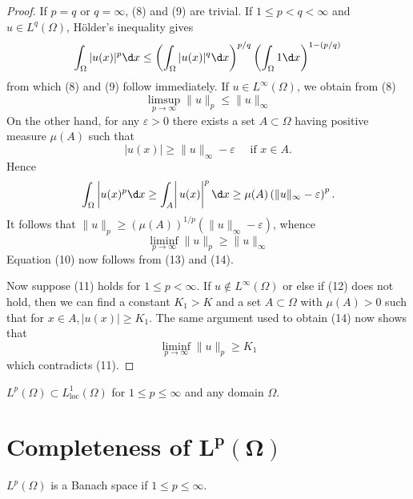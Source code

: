 \begin{proof}
  If $p=q$ or $q=\infty$, (8) and (9) are trivial. If $1 \leq p<q<\infty$ and $u \in L^q(\Omega)$, Hölder's inequality gives
  \[
  \int_{\Omega}|u(x)|^p \d x \leq\left(\int_{\Omega}|u(x)|^q \d x\right)^{p / q}\left(\int_{\Omega} 1 \d x\right)^{1-(p / q)}
  \]
  from which (8) and (9) follow immediately. If $u \in L^{\infty}(\Omega)$, we obtain from (8)
  \begin{equation}\label{eq:2.13}
    \limsup_{p\rightarrow \infty}\|u\|_p \leq\|u\|_{\infty}
  \end{equation}
  On the other hand, for any $\varepsilon>0$ there exists a set $A \subset \Omega$ having positive measure $\mu(A)$ such that
  \[
  |u(x)| \geq\|u\|_{\infty}-\varepsilon \quad \text { if } x \in A .
  \]
  Hence
  \[
  \left.\int_{\Omega}\left|u(x)^p \d x \geq \int_A\right| u(x)\right|^p \d x \geq \mu(A)\left(\|u\|_{\infty}-\varepsilon\right)^p .
  \]
  It follows that $\|u\|_p \geq(\mu(A))^{1 / p}\left(\|u\|_{\infty}-\varepsilon\right)$, whence
  \begin{equation}\label{eq:2.14}
    \liminf_{p \rightarrow \infty}\|u\|_p \geq\|u\|_{\infty}
  \end{equation}
  Equation (10) now follows from (13) and (14).
  
  Now suppose (11) holds for $1 \leq p<\infty$. If $u \notin L^{\infty}(\Omega)$ or else if (12) does not hold, then we can find a constant $K_1>K$ and a set $A \subset \Omega$ with $\mu(A)>0$ such that for $x \in A,|u(x)| \geq K_1$. The same argument used to obtain (14) now shows that
  \[
  \liminf _{p \rightarrow \infty}\|u\|_p \geq K_1
  \]
  which contradicts (11).
\end{proof}

\begin{corollary}
  $L^p(\Omega) \subset L_{\mathrm{loc}}^1(\Omega)$ for $1 \leq p \leq \infty$ and any domain $\Omega$.
\end{corollary}


\section[Completeness of \texorpdfstring{$L^p(\Omega)$}{L\textasciicircum p(Ω)}]{Completeness of $\bm{L^p(\Omega)}$}

\begin{theorem}
  $L^p(\Omega)$ is a Banach space if $1 \leq p \leq \infty$.
\end{theorem}

